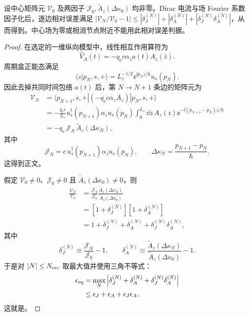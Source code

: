\begin{proposition}[逐边矩阵元的乘积相对误差]
设中心矩阵元 $\mathcal V_0$ 及两因子 $\mathcal J_0,\widetilde A_z(\Delta\kappa_0)$ 均非零。Dirac 电流与场 Fourier 系数因子化后，逐边相对误差满足 $|\mathcal V_N/\mathcal V_0-1|\le|\delta_J^{(N)}|+|\delta_A^{(N)}|+|\delta_J^{(N)}\delta_A^{(N)}|$，从而得到。中心场为零或相消节点附近不能用此相对误差判据。
\end{proposition}
\begin{proof}
在选定的一维纵向模型中，线性相互作用算符为
\begin{equation*}
 \hat V_A(t)=-q_{\mathrm e} c\alpha_z a(t)A_z(\hat z).
\end{equation*}
周期盒正能态满足
\begin{equation*}
 \langle z|p_N,s,+\rangle
 =L_z^{-1/2}\ee^{\ii p_Nz/\hbar}u_s(p_N).
\end{equation*}
因此去掉共同时间包络 $a(t)$ 后，第 $N\to N+1$ 条边的矩阵元为
\begin{align*}
 \mathcal V_N
 &=\langle p_{N+1},s,+|
 (-q_{\mathrm e} c\alpha_zA_z)
 |p_N,s,+\rangle\\
 &=-\frac{q_{\mathrm e} c}{L_z}
 u_s^\dagger(p_{N+1})\alpha_z u_s(p_N)
 \int_0^{L_z}\dd z\,
 A_z(z)\ee^{-\ii(p_{N+1}-p_N)z/\hbar}\\
 &=-q_{\mathrm e}\,\mathcal J_N\,
 \widetilde A_z(\Delta\kappa_N),
\end{align*}
其中
\begin{equation*}
 \mathcal J_N=c\,u_s^\dagger(p_{N+1})\alpha_z u_s(p_N),
 \qquad
 \Delta\kappa_N=\frac{p_{N+1}-p_N}{\hbar}.
\end{equation*}
这得到正文。

假定 $\mathcal V_0\neq0$、$\mathcal J_0\neq0$ 且 $\widetilde A_z(\Delta\kappa_0)\neq0$，则
\begin{align*}
 \frac{\mathcal V_N}{\mathcal V_0}
 &=\frac{\mathcal J_N}{\mathcal J_0}
 \frac{\widetilde A_z(\Delta\kappa_N)}
 {\widetilde A_z(\Delta\kappa_0)}\\
 &=\left[1+\delta_J^{(N)}\right]
 \left[1+\delta_A^{(N)}\right]\\
 &=1+\delta_J^{(N)}+\delta_A^{(N)}
 +\delta_J^{(N)}\delta_A^{(N)},
\end{align*}
其中
\begin{equation*}
 \delta_J^{(N)}\equiv\frac{\mathcal J_N}{\mathcal J_0}-1,
 \qquad
 \delta_A^{(N)}\equiv
 \frac{\widetilde A_z(\Delta\kappa_N)}
 {\widetilde A_z(\Delta\kappa_0)}-1.
\end{equation*}
于是对 $|N|\le N_{\rm occ}$ 取最大值并使用三角不等式：
\begin{align*}
 \epsilon_{\rm eq}
 &=\max_N\left|
 \delta_J^{(N)}+\delta_A^{(N)}
 +\delta_J^{(N)}\delta_A^{(N)}\right|\\
 &\le\epsilon_J+\epsilon_A+\epsilon_J\epsilon_A,
\end{align*}
这就是。


\end{proof}
